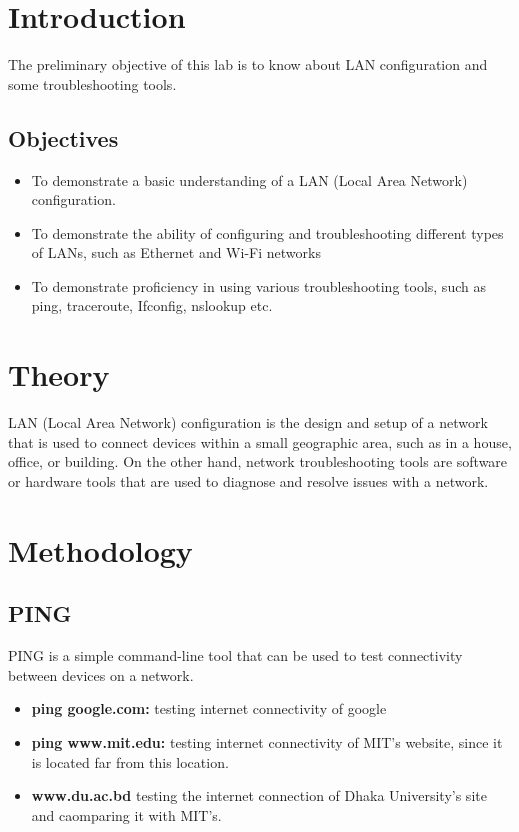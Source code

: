 \documentclass[11pt]{article}
\begin{document}
\section{Introduction}
The preliminary objective of this lab is to know about LAN configuration and some troubleshooting tools. 
\subsection{Objectives}
\begin{itemize}
    \item To demonstrate a basic understanding of a LAN (Local Area Network) configuration.
    \item To demonstrate the ability of configuring and troubleshooting different types of LANs, such as Ethernet and Wi-Fi networks
    \item To demonstrate proficiency in using various troubleshooting tools, such as ping, traceroute, Ifconfig, nslookup etc.
    \end{itemize}
\section{Theory}
LAN (Local Area Network) configuration is the design and setup of a network that is used to connect devices within a small geographic area, such as in a house, office, or building. On the other hand, network troubleshooting tools are software or hardware tools that are used to diagnose and resolve issues with a network.
\section{Methodology}

\subsection{PING}
PING is a simple command-line tool that can be used to test connectivity between devices on a network.
\begin{itemize}
    \item \textbf{ping google.com:} testing internet connectivity of google
    \item \textbf{ping www.mit.edu:} testing internet connectivity of MIT's website, since it is located far from this location.
    \item \textbf{www.du.ac.bd} testing the internet connection of Dhaka University's site and caomparing it with MIT's.
\end{itemize}
\end{document}
